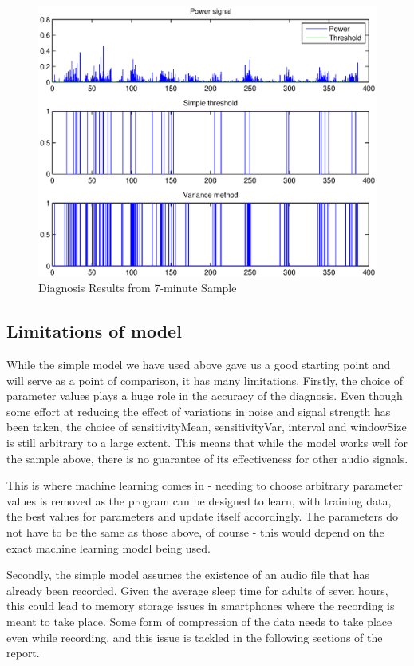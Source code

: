\begin{figure}[h]
\centering
\includegraphics[width=1\textwidth]{drawings/simpleResults}
\caption{Diagnosis Results from 7-minute Sample}
\label{fig:simpleResults}
\end{figure}

\subsection{Limitations of model}

While the simple model we have used above gave us a good starting point and will serve as a point of comparison, it has many limitations. Firstly, the choice of parameter values plays a huge role in the accuracy of the diagnosis. Even though some effort at reducing the effect of variations in noise and signal strength has been taken, the choice of sensitivityMean, sensitivityVar, interval and windowSize is still arbitrary to a large extent. This means that while the model works well for the sample above, there is no guarantee of its effectiveness for other audio signals.

This is where machine learning comes in - needing to choose arbitrary parameter values is removed as the program can be designed to learn, with training data, the best values for parameters and update itself accordingly. The parameters do not have to be the same as those above, of course - this would depend on the exact machine learning model being used.

Secondly, the simple model assumes the existence of an audio file that has already been recorded. Given the average sleep time for adults of seven hours, this could lead to memory storage issues in smartphones where the recording is meant to take place. Some form of compression of the data needs to take place even while recording, and this issue is tackled in the following sections of the report.